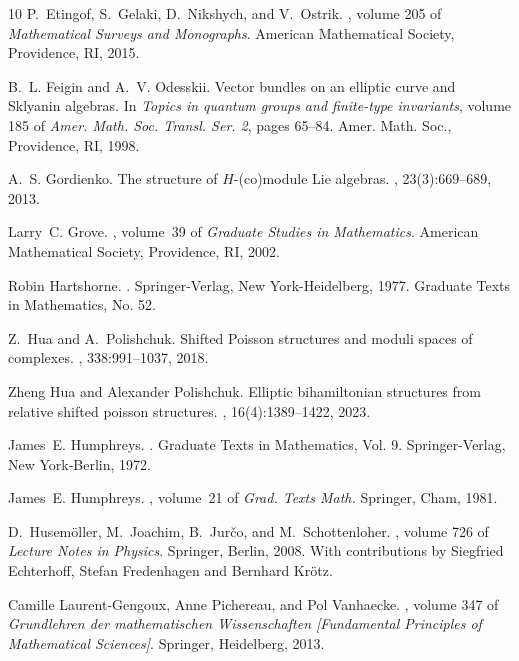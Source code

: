 \documentclass[11pt,leqno]{article}
\theoremstyle{plain}
\theoremstyle{plain}
\theoremstyle{plain}
\numberwithin{equation}{section}
\theoremstyle{nonumberplain}
\newcommand\1{{\bf 1}}
\begin{document}
\begin{thebibliography}{10}
P.~Etingof, S.~Gelaki, D.~Nikshych, and V.~Ostrik.
, volume 205 of {\em Mathematical Surveys and
  Monographs}.
\newblock American Mathematical Society, Providence, RI, 2015.

B.~L. Feigin and A.~V. Odesskii.
\newblock Vector bundles on an elliptic curve and {S}klyanin algebras.
\newblock In {\em Topics in quantum groups and finite-type invariants}, volume
  185 of {\em Amer. Math. Soc. Transl. Ser. 2}, pages 65--84. Amer. Math. Soc.,
  Providence, RI, 1998.

A.~S. Gordienko.
\newblock The structure of {$H$}-(co)module {L}ie algebras.
, 23(3):669--689, 2013.

Larry~C. Grove.
, volume~39 of {\em
  Graduate Studies in Mathematics}.
\newblock American Mathematical Society, Providence, RI, 2002.

Robin Hartshorne.
.
\newblock Springer-Verlag, New York-Heidelberg, 1977.
\newblock Graduate Texts in Mathematics, No. 52.

Z.~Hua and A.~Polishchuk.
\newblock Shifted {P}oisson structures and moduli spaces of complexes.
, 338:991--1037, 2018.

Zheng Hua and Alexander Polishchuk.
\newblock Elliptic bihamiltonian structures from relative shifted poisson
  structures.
, 16(4):1389--1422, 2023.

James~E. Humphreys.
.
\newblock Graduate Texts in Mathematics, Vol. 9. Springer-Verlag, New
  York-Berlin, 1972.

James~E. Humphreys.
, volume~21 of
  {\em Grad. Texts Math.}
\newblock Springer, Cham, 1981.

D.~Husem\"{o}ller, M.~Joachim, B.~Jur\v{c}o, and M.~Schottenloher.
, volume 726
  of {\em Lecture Notes in Physics}.
\newblock Springer, Berlin, 2008.
\newblock With contributions by Siegfried Echterhoff, Stefan Fredenhagen and
  Bernhard Kr\"{o}tz.

Camille Laurent-Gengoux, Anne Pichereau, and Pol Vanhaecke.
, volume 347 of {\em Grundlehren der
  mathematischen Wissenschaften [Fundamental Principles of Mathematical
  Sciences]}.
\newblock Springer, Heidelberg, 2013.


\end{thebibliography}
\end{document}
